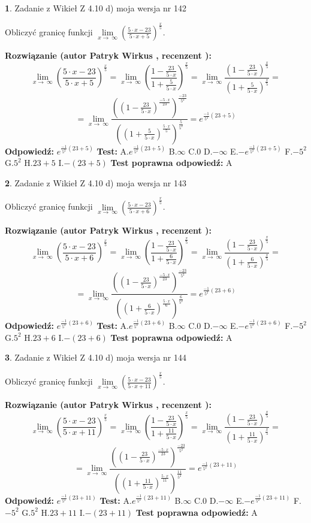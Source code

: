 \documentclass[12pt, a4paper]{article}
\theoremstyle{definition} %
\newtheorem{zad}{}
\newcommand{\zadStart}[1]{\begin{zad}#1\newline}
\newcommand{\zadStop}{\end{zad}}
\newcommand{\rozwStart}[2]{\noindent \textbf{Rozwiązanie (autor #1 , recenzent #2): }\newline}
\newcommand{\rozwStop}{\newline}
\newcommand{\odpStart}{\noindent \textbf{Odpowiedź:}\newline}
\newcommand{\odpStop}{\newline}
\newcommand{\testStart}{\noindent \textbf{Test:}\newline}
\newcommand{\testStop}{\newline}
\newcommand{\kluczStart}{\noindent \textbf{Test poprawna odpowiedź:}\newline}
\newcommand{\kluczStop}{\newline}
\begin{document}
\zadStart{Zadanie z Wikieł Z 4.10 d) moja wersja nr 142}


Obliczyć granicę funkcji  $\lim\limits_{x\to\ \infty}(\frac{5\cdot x-23}{5\cdot x+5})^{\frac{x}{5}}$.
\zadStop
\rozwStart{Patryk Wirkus}{}
$$\lim\limits_{x\to\ \infty}(\frac{5\cdot x-23}{5\cdot x+5})^{\frac{x}{5}} = \lim\limits_{x\to\ \infty}(\frac{1-\frac{23}{5\cdot x}}{1+\frac{5}{5\cdot x}})^{\frac{x}{5}}=\lim\limits_{x\to\ \infty}\frac{(1-\frac{23}{5\cdot x})^{\frac{x}{5}}}{(1+\frac{5}{5\cdot x})^{\frac{x}{5}}}=$$
$$=\lim\limits_{x\to\ \infty}\frac{((1-\frac{23}{5\cdot x})^{\frac{-5\cdot x}{23}})^{\frac{-23}{5^{2}}}}{((1+\frac{5}{5\cdot x})^{\frac{5\cdot x}{5}})^{\frac{5}{5^{2}}}}=e^{\frac{-1}{5^{2}}(23+5)}$$
\rozwStop
\odpStart
$e^{\frac{-1}{5^{2}}(23+5)}$
\odpStop
\testStart
A.$e^{\frac{-1}{5^{2}}(23+5)}$ B.$\infty$ C.$0$ D.$-\infty$ E.$-e^{\frac{-1}{5^{2}}(23+5)}$
F.$-5^{2}$ G.$5^{2}$
H.$23+5$
I.$-(23+5)$
\testStop
\kluczStart
A
\kluczStop



\zadStart{Zadanie z Wikieł Z 4.10 d) moja wersja nr 143}


Obliczyć granicę funkcji  $\lim\limits_{x\to\ \infty}(\frac{5\cdot x-23}{5\cdot x+6})^{\frac{x}{5}}$.
\zadStop
\rozwStart{Patryk Wirkus}{}
$$\lim\limits_{x\to\ \infty}(\frac{5\cdot x-23}{5\cdot x+6})^{\frac{x}{5}} = \lim\limits_{x\to\ \infty}(\frac{1-\frac{23}{5\cdot x}}{1+\frac{6}{5\cdot x}})^{\frac{x}{5}}=\lim\limits_{x\to\ \infty}\frac{(1-\frac{23}{5\cdot x})^{\frac{x}{5}}}{(1+\frac{6}{5\cdot x})^{\frac{x}{5}}}=$$
$$=\lim\limits_{x\to\ \infty}\frac{((1-\frac{23}{5\cdot x})^{\frac{-5\cdot x}{23}})^{\frac{-23}{5^{2}}}}{((1+\frac{6}{5\cdot x})^{\frac{5\cdot x}{6}})^{\frac{6}{5^{2}}}}=e^{\frac{-1}{5^{2}}(23+6)}$$
\rozwStop
\odpStart
$e^{\frac{-1}{5^{2}}(23+6)}$
\odpStop
\testStart
A.$e^{\frac{-1}{5^{2}}(23+6)}$ B.$\infty$ C.$0$ D.$-\infty$ E.$-e^{\frac{-1}{5^{2}}(23+6)}$
F.$-5^{2}$ G.$5^{2}$
H.$23+6$
I.$-(23+6)$
\testStop
\kluczStart
A
\kluczStop



\zadStart{Zadanie z Wikieł Z 4.10 d) moja wersja nr 144}


Obliczyć granicę funkcji  $\lim\limits_{x\to\ \infty}(\frac{5\cdot x-23}{5\cdot x+11})^{\frac{x}{5}}$.
\zadStop
\rozwStart{Patryk Wirkus}{}
$$\lim\limits_{x\to\ \infty}(\frac{5\cdot x-23}{5\cdot x+11})^{\frac{x}{5}} = \lim\limits_{x\to\ \infty}(\frac{1-\frac{23}{5\cdot x}}{1+\frac{11}{5\cdot x}})^{\frac{x}{5}}=\lim\limits_{x\to\ \infty}\frac{(1-\frac{23}{5\cdot x})^{\frac{x}{5}}}{(1+\frac{11}{5\cdot x})^{\frac{x}{5}}}=$$
$$=\lim\limits_{x\to\ \infty}\frac{((1-\frac{23}{5\cdot x})^{\frac{-5\cdot x}{23}})^{\frac{-23}{5^{2}}}}{((1+\frac{11}{5\cdot x})^{\frac{5\cdot x}{11}})^{\frac{11}{5^{2}}}}=e^{\frac{-1}{5^{2}}(23+11)}$$
\rozwStop
\odpStart
$e^{\frac{-1}{5^{2}}(23+11)}$
\odpStop
\testStart
A.$e^{\frac{-1}{5^{2}}(23+11)}$ B.$\infty$ C.$0$ D.$-\infty$ E.$-e^{\frac{-1}{5^{2}}(23+11)}$
F.$-5^{2}$ G.$5^{2}$
H.$23+11$
I.$-(23+11)$
\testStop
\kluczStart
A
\kluczStop
\end{document}
